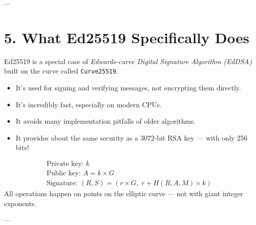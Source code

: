 \documentclass[12pt]{article}
\begin{document}
\begin{center}
\end{center}

---

\section*{5. What Ed25519 Specifically Does}

Ed25519 is a special case of \emph{Edwards-curve Digital Signature Algorithm (EdDSA)}  
built on the curve called \texttt{Curve25519}.

\begin{itemize}
    \item It’s used for signing and verifying messages, not encrypting them directly.
    \item It’s incredibly fast, especially on modern CPUs.
    \item It avoids many implementation pitfalls of older algorithms.
    \item It provides about the same security as a 3072-bit RSA key — with only 256 bits!
\end{itemize}

\[
\begin{array}{c}
\text{Private key: } k \\
\text{Public key: } A = k \times G \\
\text{Signature: } (R, S) = (r \times G, \; r + H(R, A, M) \times k)
\end{array}
\]
All operations happen on points on the elliptic curve — not with giant integer exponents.

---
\end{document}
